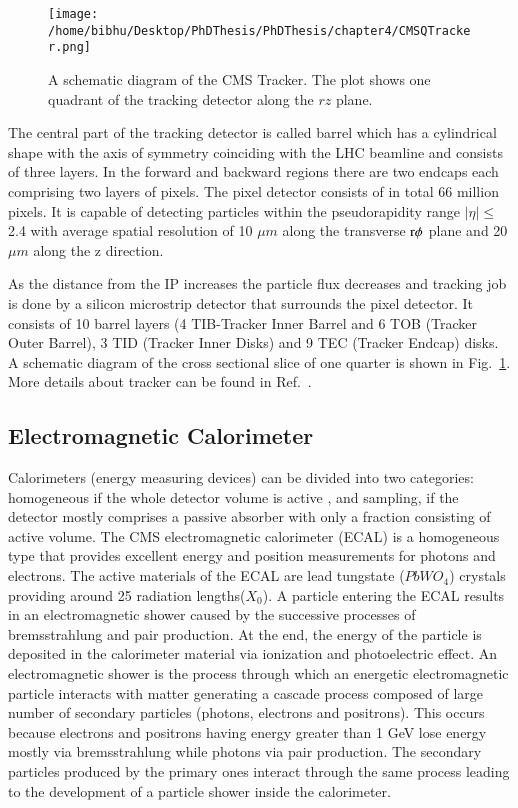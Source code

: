 \begin{figure}[h]
    \centering  
    \texttt{[image: /home/bibhu/Desktop/PhDThesis/PhDThesis/chapter4/CMSQTracker.png]}
    \caption{ \small A schematic diagram of the CMS Tracker. The plot shows one quadrant of the tracking detector along the $rz$ plane.}
    \label{fig:CMSQTracker1}
\end{figure}


The central part of the tracking detector is called barrel which has a cylindrical shape with the axis of symmetry coinciding with the LHC beamline and consists of three layers. In the forward and backward regions there are two endcaps each comprising two layers of pixels. The pixel detector consists of in total 66 million pixels. It is capable of detecting particles within the  pseudorapidity range $|\eta| \leq$ 2.4 with average spatial resolution of 10 $\mu m$ along the transverse $\rm r\phi$ plane and 20 $\mu m $ along the z direction.

As the distance from the IP increases the particle flux decreases and tracking job is done by a silicon microstrip detector that surrounds the pixel detector. It consists of 10 barrel layers (4 TIB-Tracker Inner Barrel and 6 TOB (Tracker Outer Barrel), 3 TID (Tracker Inner Disks)  and 9 TEC (Tracker Endcap) disks. A schematic diagram of the cross sectional slice of one quarter is shown in Fig.~\ref{fig:CMSQTracker1}. More details about tracker can be found in Ref.~\cite{physics-tdr-8.1}.  


\subsection{Electromagnetic Calorimeter}

Calorimeters (energy measuring devices) can be divided into two categories: homogeneous if the whole detector volume is active , and sampling, if the detector mostly comprises a passive absorber with only a fraction consisting of active volume. The CMS electromagnetic calorimeter (ECAL) is a homogeneous type that provides excellent energy and position measurements for photons and electrons. The active materials of the ECAL are lead tungstate ($PbWO_{4}$)  crystals providing around 25 radiation lengths($X_{0}$). A particle entering the ECAL results in an electromagnetic shower caused by the successive processes of bremsstrahlung and pair production. At the end, the energy of the particle is deposited in the calorimeter material via ionization and photoelectric effect. An electromagnetic shower is the process through which an energetic electromagnetic particle interacts with matter generating a cascade process composed of large number of secondary particles (photons, electrons and positrons). This occurs because electrons and positrons having energy greater than 1 GeV lose energy mostly via bremsstrahlung while photons via pair production. The secondary particles produced by the primary ones interact through the same process leading to the development of a particle shower inside the calorimeter. 


